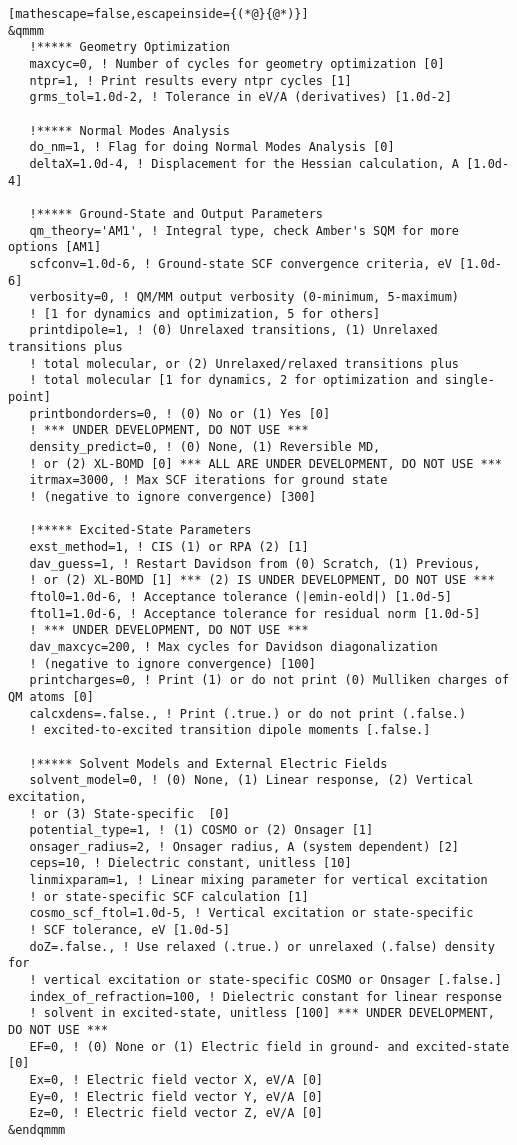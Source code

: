 \begin{lstlisting}[mathescape=false,escapeinside={(*@}{@*)}]
&qmmm
   !***** Geometry Optimization
   maxcyc=0, ! Number of cycles for geometry optimization [0]
   ntpr=1, ! Print results every ntpr cycles [1]
   grms_tol=1.0d-2, ! Tolerance in eV/A (derivatives) [1.0d-2]

   !***** Normal Modes Analysis
   do_nm=1, ! Flag for doing Normal Modes Analysis [0]
   deltaX=1.0d-4, ! Displacement for the Hessian calculation, A [1.0d-4]

   !***** Ground-State and Output Parameters
   qm_theory='AM1', ! Integral type, check Amber's SQM for more options [AM1]
   scfconv=1.0d-6, ! Ground-state SCF convergence criteria, eV [1.0d-6]
   verbosity=0, ! QM/MM output verbosity (0-minimum, 5-maximum)
   ! [1 for dynamics and optimization, 5 for others]
   printdipole=1, ! (0) Unrelaxed transitions, (1) Unrelaxed transitions plus
   ! total molecular, or (2) Unrelaxed/relaxed transitions plus
   ! total molecular [1 for dynamics, 2 for optimization and single-point]
   printbondorders=0, ! (0) No or (1) Yes [0]
   ! *** UNDER DEVELOPMENT, DO NOT USE ***
   density_predict=0, ! (0) None, (1) Reversible MD,
   ! or (2) XL-BOMD [0] *** ALL ARE UNDER DEVELOPMENT, DO NOT USE ***
   itrmax=3000, ! Max SCF iterations for ground state
   ! (negative to ignore convergence) [300]

   !***** Excited-State Parameters
   exst_method=1, ! CIS (1) or RPA (2) [1]
   dav_guess=1, ! Restart Davidson from (0) Scratch, (1) Previous,
   ! or (2) XL-BOMD [1] *** (2) IS UNDER DEVELOPMENT, DO NOT USE ***
   ftol0=1.0d-6, ! Acceptance tolerance (|emin-eold|) [1.0d-5]
   ftol1=1.0d-6, ! Acceptance tolerance for residual norm [1.0d-5]
   ! *** UNDER DEVELOPMENT, DO NOT USE ***
   dav_maxcyc=200, ! Max cycles for Davidson diagonalization
   ! (negative to ignore convergence) [100]
   printcharges=0, ! Print (1) or do not print (0) Mulliken charges of QM atoms [0]
   calcxdens=.false., ! Print (.true.) or do not print (.false.)
   ! excited-to-excited transition dipole moments [.false.]

   !***** Solvent Models and External Electric Fields
   solvent_model=0, ! (0) None, (1) Linear response, (2) Vertical excitation,
   ! or (3) State-specific  [0]
   potential_type=1, ! (1) COSMO or (2) Onsager [1]
   onsager_radius=2, ! Onsager radius, A (system dependent) [2]
   ceps=10, ! Dielectric constant, unitless [10]
   linmixparam=1, ! Linear mixing parameter for vertical excitation
   ! or state-specific SCF calculation [1]
   cosmo_scf_ftol=1.0d-5, ! Vertical excitation or state-specific
   ! SCF tolerance, eV [1.0d-5]
   doZ=.false., ! Use relaxed (.true.) or unrelaxed (.false) density for
   ! vertical excitation or state-specific COSMO or Onsager [.false.]
   index_of_refraction=100, ! Dielectric constant for linear response
   ! solvent in excited-state, unitless [100] *** UNDER DEVELOPMENT, DO NOT USE ***
   EF=0, ! (0) None or (1) Electric field in ground- and excited-state [0]
   Ex=0, ! Electric field vector X, eV/A [0]
   Ey=0, ! Electric field vector Y, eV/A [0]
   Ez=0, ! Electric field vector Z, eV/A [0]
&endqmmm


\end{lstlisting}
